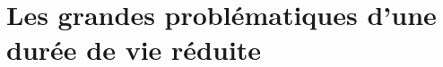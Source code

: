 \chapter{Les grandes problématiques d’une durée de vie réduite}
\label{chapter::pb_duree_vie_reduite}